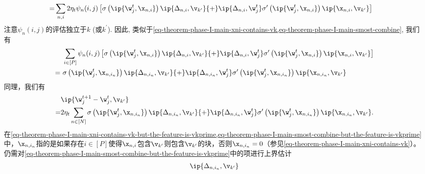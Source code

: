 \begin{myproof}
\begin{equation}
\begin{aligned}
    =& \sum_{n,i} 2 \eta_t \psi_n(i,j) \left[ \sigma\left(\ip{\w_j^{t},\x_{n,i}}   \right) \ip{\Delta_{n,i},\v_{k^{\prime}}} 
    {+} \ip{\Delta_{n,i}, \w_j^{t}} \sigma^{\prime}\left(\ip{\w_j^{t},\x_{n,i}}  \right) \ip{\x_{n,i},\v_{k^{\prime}}} \right]
\end{aligned}
\end{equation}
注意$\psi_n(i,j)$的评估独立于$k$ (或$k^{\prime}$).
因此, 类似于\cref{eq-theorem-phase-I-main-xni-contains-vk,eq-theorem-phase-I-main-smost-combine}, 我们有
\begin{equation}\label{eq-theorem-phase-I-main-xni-contains-vk-but-the-feature-is-vkprime}
\begin{aligned}
    &\sum_{i \in [P]} \psi_n(i,j) \left[ \sigma\left(\ip{\w_j^{t},\x_{n,i}}   \right) \ip{\Delta_{n,i},\v_{k^{\prime}}} 
    {+} \ip{\Delta_{n,i}, \w_j^{t}} \sigma^{\prime}\left(\ip{\w_j^{t},\x_{n,i}}  \right) \ip{\x_{n,i},\v_{k^{\prime}}} \right] \\
    = \ & \sigma\left(\ip{\w_j^{t},\x_{n,i_n}}   \right) \ip{\Delta_{n,i_n},\v_{k^{\prime}}} 
    {+} \ip{\Delta_{n,i_n}, \w_j^{t}} \sigma^{\prime}\left(\ip{\w_j^{t},\x_{n,i_n}}  \right) \ip{\x_{n,i_n},\v_{k^{\prime}}}
\end{aligned}
\end{equation}
同理，我们有
\begin{equation}\label{eq-theorem-phase-I-main-smost-combine-but-the-feature-is-vkprime}
    \begin{aligned}
    & \ip{\w^{t+1}_j - \w^{t}_j,\v_{k^{\prime}}} \\
    = & 2\eta_t \sum_{n \in [N]} \sigma\left(\ip{\w_j^{t},\x_{n,i_n}}   \right) \ip{\Delta_{n,i_n},\v_{k^{\prime}}} 
    {+} \ip{\Delta_{n,i_n}, \w_j^{t}} \sigma^{\prime}\left(\ip{\w_j^{t},\x_{n,i_n}}  \right) \ip{\x_{n,i_n},\v_{k^{\prime}}}.
    \end{aligned}
\end{equation}
在\cref{eq-theorem-phase-I-main-xni-contains-vk-but-the-feature-is-vkprime,eq-theorem-phase-I-main-smost-combine-but-the-feature-is-vkprime}中，$\x_{n, i_n}$指的是如果存在$i \in [P]$使得$\x_{n,i}$包含$\v_{k^{\prime}}$则包含$\v_{k^{\prime}}$的块，否则$\x_{n, i_n}  = 0$（参见\cref{eq-theorem-phase-I-main-xni-contains-vk}\!）。
仍需对\cref{eq-theorem-phase-I-main-smost-combine-but-the-feature-is-vkprime}中的项进行上界估计
\begin{equation}\label{eq-theorem-phase-I-main-sum-ip-delta-ni-vi-but-the-feature-is-vkprime}
\begin{aligned}
    \ip{\Delta_{n,i_n},\v_{k^{\prime}}} 

\end{aligned}
\end{equation}
\end{myproof}
